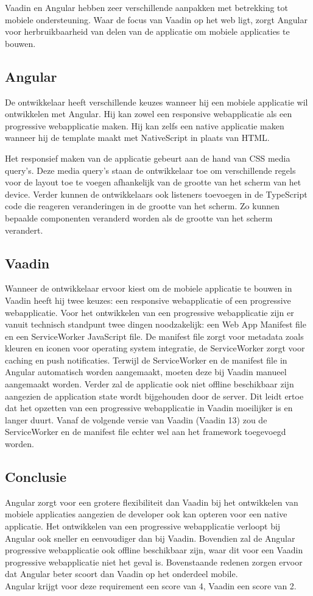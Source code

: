 Vaadin en Angular hebben zeer verschillende aanpakken met betrekking tot mobiele ondersteuning. Waar de focus van Vaadin op het web ligt, zorgt Angular voor herbruikbaarheid van delen van de applicatie om mobiele applicaties te bouwen.
\subsection{Angular}
De ontwikkelaar heeft verschillende keuzes wanneer hij een mobiele applicatie wil ontwikkelen met Angular. Hij kan zowel een responsive webapplicatie als een progressive webapplicatie maken. Hij kan zelfs een native applicatie maken wanneer hij de template maakt met NativeScript in plaats van HTML. 

Het responsief maken van de applicatie gebeurt aan de hand van CSS media query's. Deze media query's staan de ontwikkelaar toe om verschillende regels voor de layout toe te voegen afhankelijk van de grootte van het scherm van het device. Verder kunnen de ontwikkelaars ook listeners toevoegen in de TypeScript code die reageren veranderingen in de grootte van het scherm. Zo kunnen bepaalde componenten veranderd worden als de grootte van het scherm verandert. 

\subsection{Vaadin}
Wanneer de ontwikkelaar ervoor kiest om de mobiele applicatie te bouwen in Vaadin heeft hij twee keuzes: een responsive webapplicatie of een progressive webapplicatie. 
Voor het ontwikkelen van een progressive webapplicatie zijn er vanuit technisch standpunt twee dingen noodzakelijk: een  Web App Manifest file en een ServiceWorker JavaScript file. De manifest file zorgt voor metadata zoals kleuren en iconen voor operating system integratie, de ServiceWorker zorgt voor caching en push notificaties.
Terwijl de ServiceWorker en de manifest file in Angular automatisch worden aangemaakt, moeten deze bij Vaadin manueel aangemaakt worden. Verder zal de applicatie ook niet offline beschikbaar zijn aangezien de application state wordt bijgehouden door de server.
Dit leidt ertoe dat het opzetten van een progressive webapplicatie in Vaadin moeilijker is en langer duurt.  
Vanaf de volgende versie van Vaadin (Vaadin 13) zou de ServiceWorker en de manifest file echter wel aan het framework toegevoegd worden. 
\subsection{Conclusie}
Angular zorgt voor een grotere flexibiliteit dan Vaadin bij het ontwikkelen van mobiele applicaties aangezien de developer ook kan opteren voor een native applicatie. Het ontwikkelen van een progressive webapplicatie verloopt bij Angular ook sneller en eenvoudiger dan bij Vaadin. Bovendien zal de Angular progressive webapplicatie ook offline beschikbaar zijn, waar dit voor een Vaadin progressive webapplicatie niet het geval is. Bovenstaande redenen zorgen ervoor dat Angular beter scoort dan Vaadin op het onderdeel mobile. \\
Angular krijgt voor deze requirement een score van 4, Vaadin een score van 2.

